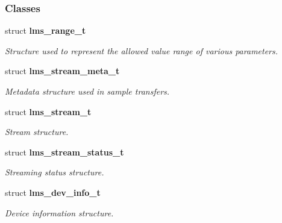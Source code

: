 \subsubsection*{Classes}
\begin{DoxyCompactItemize}
\item 
struct {\bf lms\+\_\+range\+\_\+t}
\begin{DoxyCompactList}\small\item\em Structure used to represent the allowed value range of various parameters. \end{DoxyCompactList}\item 
struct {\bf lms\+\_\+stream\+\_\+meta\+\_\+t}
\begin{DoxyCompactList}\small\item\em Metadata structure used in sample transfers. \end{DoxyCompactList}\item 
struct {\bf lms\+\_\+stream\+\_\+t}
\begin{DoxyCompactList}\small\item\em Stream structure. \end{DoxyCompactList}\item 
struct {\bf lms\+\_\+stream\+\_\+status\+\_\+t}
\begin{DoxyCompactList}\small\item\em Streaming status structure. \end{DoxyCompactList}\item 
struct {\bf lms\+\_\+dev\+\_\+info\+\_\+t}
\begin{DoxyCompactList}\small\item\em Device information structure. \end{DoxyCompactList}\end{DoxyCompactItemize}
